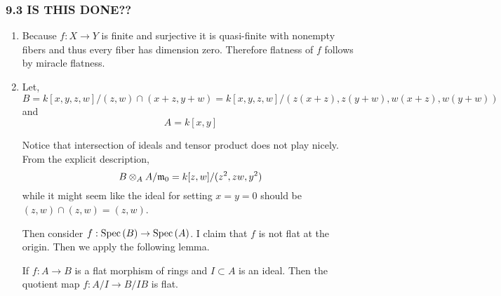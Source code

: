 \documentclass[12pt]{article}
\begin{document}
\subsubsection{9.3 IS THIS DONE??}

\begin{enumerate}
\item Because $f : X \to Y$ is finite and surjective it is quasi-finite with nonempty fibers and thus every fiber has dimension zero. Therefore flatness of $f$ follows by miracle flatness.
\item Let,
\[ B = k[x,y,z,w]/(z,w) \cap (x+z,y+w) = k[x,y,z,w]/(z(x+z), z(y+w), w(x+z), w(y+w)) \]
and 
\[ A = k[x,y] \]
\begin{rmk}
Notice that intersection of ideals and tensor product does not play nicely. From the explicit description,
\[ B \otimes_{A} A / \mathfrak{m}_0 = k[z,w]/(z^2, zw, y^2) \]
while it might seem like the ideal for setting $x=y=0$ should be $(z,w) \cap (z,w) = (z,w)$.
\end{rmk}
\noindent
Then consider $f : \mathrm{Spec}\left( B \right) \to \mathrm{Spec}\left( A \right)$. I claim that $f$ is not flat at the origin. Then we apply the following lemma.

\begin{lemma}
If $f : A \to B$ is a flat morphism of rings and $I \subset A$ is an ideal. Then the quotient map $f : A/I \to B/IB$ is flat. 
\end{lemma}


\end{enumerate}
\end{document}
